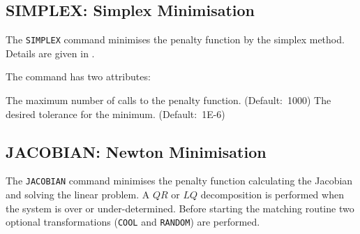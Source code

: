 \subsection{SIMPLEX: Simplex Minimisation}
\label{subsec:match_simplex}
The {\tt SIMPLEX} command minimises the penalty function by the simplex
method. Details are given in \cite{MINUIT}.


The command has two attributes: 
\begin{madlist}
    The maximum number of calls to the penalty
   function. (Default:~1000) 
    The desired tolerance for the minimum. 
   (Default:~1E-6)
\end{madlist} 

\subsection{JACOBIAN: Newton Minimisation}
\label{subsec:match_jacobian}
The {\tt JACOBIAN} command minimises the penalty function calculating the
Jacobian and solving the linear problem. A $Q R$ or $L Q$  decomposition is
performed when the system is over or under-determined. Before starting
the matching routine two optional transformations ({\tt COOL} and {\tt RANDOM}) 
are performed. 


